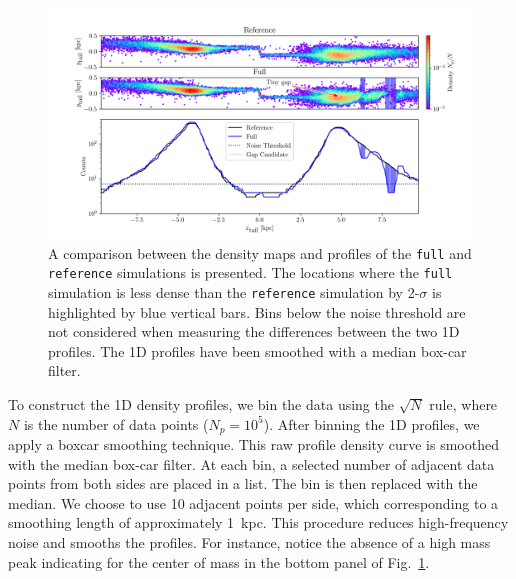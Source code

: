 \documentclass{aa}
\begin{document}
\begin{appendix}
    \begin{figure}
      \centering
      \includegraphics[width=\linewidth, trim=20 0 15 0]{monte-carlo-009-pouliasis2017pii-GCNBody-2000-milisigma-5-noisefactor-20-boxcarindexlength-shifted-0.png}
      \caption{A comparison between the density maps and profiles of the \texttt{full} and \texttt{reference} simulations is presented. The locations where the \texttt{full} simulation is less dense than the \texttt{reference} simulation by 2-$\sigma$ is highlighted by blue vertical bars. Bins below the noise threshold are not considered when measuring the differences between the two 1D profiles. The 1D profiles have been smoothed with a median box-car filter.}
      \label{fig:profiles}
      \end{figure}

    To construct the 1D density profiles, we bin the data using the $\sqrt{N}$ rule, where $N$ is the number of data points ($N_p = 10^5$). After binning the 1D profiles, we apply a boxcar smoothing technique. This raw profile density curve is smoothed with the median box-car filter. At each bin, a selected number of adjacent data points from both sides are placed in a list. The bin is then replaced with the median. We choose to use 10 adjacent points per side, which corresponding to a smoothing length of approximately 1~kpc. This procedure reduces high-frequency noise and smooths the profiles. For instance, notice the absence of a high mass peak indicating for the center of mass in the bottom panel of Fig.~\ref{fig:profiles}.


\end{appendix}
\end{document}
